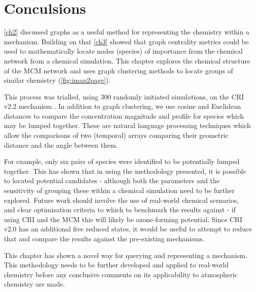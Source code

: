 %
%
%
%
%
%
%
%
%
%
%
%
%
%
%
%
%
%
%
%
%
%
%
%
%
%
%
%
%





\newpage

\section{Conculsions}

\autoref{ch2} discussed graphs as a useful method for representing the chemistry within a mechanism. Building on that \autoref{ch3} showed that graph centrality metrics could be used to mathematically locate nodes (species) of importance from the chemical network from a chemical simulation. This chapter explores the chemical structure of the MCM network and uses graph clustering methods to locate groups of similar chemistry (\autoref{fig:imap2page}).

This process was trialled, using 300 randomly initiated simulations, on the CRI v2.2 mechanism \citep{cri}. In addition to graph clustering, we use cosine and Euclidean distances to compare the concentration magnitude and profile for species which may be lumped together. These are natural language processing techniques which allow the comparisons of two (temporal) arrays comparing their geometric distance and the angle between them.

For example, only six pairs of species were identified to be potentially lumped together. This has shown that in using the methodology presented, it is possible to located potential candidates -  although both the parameters and the sensitivity of grouping these within a chemical simulation need to be further explored. Future work should involve the use of real-world chemical scenarios, and clear optimisation criteria to which to benchmark the results against - if using CRI and the MCM this will likely be ozone-forming potential. Since CRI v2.0 has an additional five reduced states, it would be useful to attempt to reduce that and compare the results against the pre-existing mechanisms.

This chapter has shown a novel way for querying and representing a mechanism. This methodology needs to be further developed and applied to real-world chemistry before any conclusive comments on its applicability to atmospheric chemistry are made.
